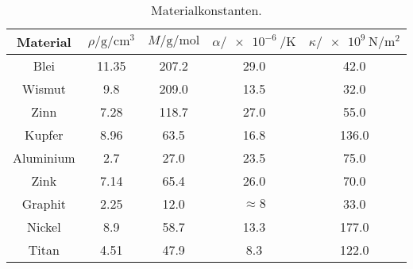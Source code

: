 \begin{table}
    \centering
    \caption{Materialkonstanten\cite{v201}.}
    \label{tab:const}
    \begin{tabular}{c S[table-format=2.1(0)e0] S[table-format=3.2(0)e0] c S[table-format=3.2(0)e0] }
        \toprule
        {Material} & {$ρ/\si{\gram\per\cm\cubed}$} & {$M/\si{\gram\per\mol}$} & {$α/\SI{e-6}{\per\kelvin}$} & {$κ/\SI{e9}{\newton\per\meter\squared}$} \\
        \midrule
        {Blei} & 11.35 & 207.2 & 29.0  & 42.0  \\
        {Wismut} & 9.8   & 209.0 & 13.5  & 32.0  \\
        {Zinn} & 7.28  & 118.7 & 27.0  & 55.0  \\
        {Kupfer} & 8.96  & 63.5  & 16.8  & 136.0     \\
        {Aluminium} & 2.7   & 27.0  & 23.5  & 75.0  \\
        {Zink} & 7.14  & 65.4  & 26.0  & 70.0  \\
        {Graphit} & 2.25  & 12.0  & {$\approx 8$}   & 33.0  \\
        {Nickel} & 8.9   & 58.7  & 13.3  & 177.0     \\
        {Titan} & 4.51  & 47.9  & 8.3   & 122.0     \\
        \bottomrule
    \end{tabular}
\end{table}
